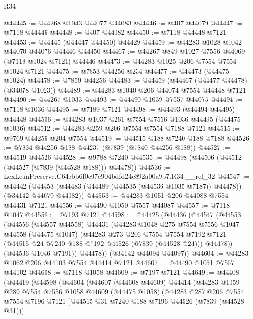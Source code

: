 \begin{lexlean}{R34}
\begin{coremodule}
@44445 := @44268 @1043 @44077 @44083
@44446 := @407 @44079
@44447 := @7118 @44446
@44448 := @407 @44082
@44450 := @7118 @44448 @7121
@44453 := @44445 (@44447 @44450) @44429
@44459 := @44283 @1028 @1042 @44070 @44076 @44446 @44450
@44467 := @44267 @849 @1027 @7556 @44069 (@7118 @1024 @7121) @44446
@44473 := @44283 @1025 @206 @7554 @7554 @1024 @7121
@44475 := @7853 @44256 @234
@44477 := @44473 (@44475 @1024)
@44478 := @7859 @44256
@44483 := @44459 (@44467 (@44477 @44478) (@34078 @1023))
@44489 := @44283 @1040 @206 @44074 @7554 @44448 @7121
@44490 := @44267 @1033
@44493 := @44490 @1039 @7557 @44073
@44494 := @7118 @1036
@44495 := @7189 @7121
@44498 := @44493 (@44494 @44495) @44448
@44506 := @44283 @1037 @261 @7554 @7556 @1036 @44495 (@44475 @1036)
@44512 := @44283 @259 @206 @7554 @7554 @7188 @7121
@44515 := @9769 @44256 @204 @7554
@44519 := @44515 @188 @7240 @188 @7188
@44526 := @7834 @44256 @188 @44237 (@7839 (@7840 @44256 @188))
@44527 := @44519 @44526
@44528 := @9788 @7240
@44535 := @44498 (@44506 (@44512 (@44527 (@7839 (@44528 @188))) @44478))
@44536 := LexLeanPreserve.C64ebb6f0c07e904bdfd24c892a00a9b7.R34.__rel_32
@44547 := @44442
    (@44453 (@44483 (@44489 (@44535 (@44536 @1035 @7187)) @44478)) (@34142 @44079 @44082))
@44553 := @44283 @1051 @206 @44088 @7554 @44431 @7121
@44556 := @44490 @1050 @7557 @44087
@44557 := @7118 @1047
@44558 := @7193 @7121
@44598 := @44425
    (@44436
      (@44547
        (@44553
          (@44556
            (@44557 @44558)
            @44431
            (@44283
              @1048
              @275
              @7554
              @7556
              @1047
              @44558
              (@44475 @1047)
              (@44283
                @273
                @206
                @7554
                @7554
                @7192
                @7121
                (@44515 @24 @7240 @188 @7192 @44526 (@7839 (@44528 @24)))
                @44478))
            (@44536 @1046 @7191))
          @44478))
      (@34142 @44094 @44097))
@44604 := @44283 @1062 @206 @44103 @7554 @44414 @7121
@44607 := @44490 @1061 @7557 @44102
@44608 := @7118 @1058
@44609 := @7197 @7121
@44649 := @44408
    (@44419
      (@44598
        (@44604
          (@44607
            (@44608 @44609)
            @44414
            (@44283
              @1059
              @289
              @7554
              @7556
              @1058
              @44609
              (@44475 @1058)
              (@44283
                @287
                @206
                @7554
                @7554
                @7196
                @7121
                (@44515 @31 @7240 @188 @7196 @44526 (@7839 (@44528 @31)))

\end{coremodule}
\end{lexlean}
